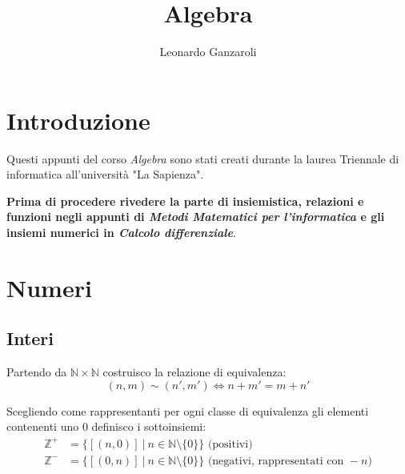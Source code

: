 \documentclass{article}
\title{Algebra}
\author{Leonardo Ganzaroli}
\date{}
\begin{document}
\maketitle


\tableofcontents

\newpage

\hypersetup{allcolors=black}

\section*{Introduzione}

Questi appunti del corso \textit{Algebra} sono stati creati durante la laurea Triennale di informatica all'università "La Sapienza".\newline

\noindent\textbf{Prima di procedere rivedere la parte di insiemistica, relazioni e funzioni negli appunti di \textit{Metodi Matematici per l'informatica} e gli insiemi numerici in \textit{Calcolo differenziale}}.

\newpage

\section{Numeri}

\subsection{Interi}

Partendo da $\mathbb{N}\times\mathbb{N}$ costruisco la relazione di equivalenza:
$$(n,m)\sim(n',m')\iff n+m'=m+n'$$\newline

\noindent Scegliendo come rappresentanti per ogni classe di equivalenza gli elementi contenenti uno 0 definisco i sottoinsiemi:
\begin{equation}
    \nonumber
    \begin{split}
        \mathbb{Z}^+&=\{[(n,0)]\ |\ n\in\mathbb{N}\setminus\{0\} \}\text{ (positivi)}\\
        \mathbb{Z}^-&=\{[(0,n)]\ |\ n\in\mathbb{N}\setminus\{0\} \}\text{ (negativi, rappresentati con }-n)\\
    \end{split}
\end{equation}\newline
\end{document}
